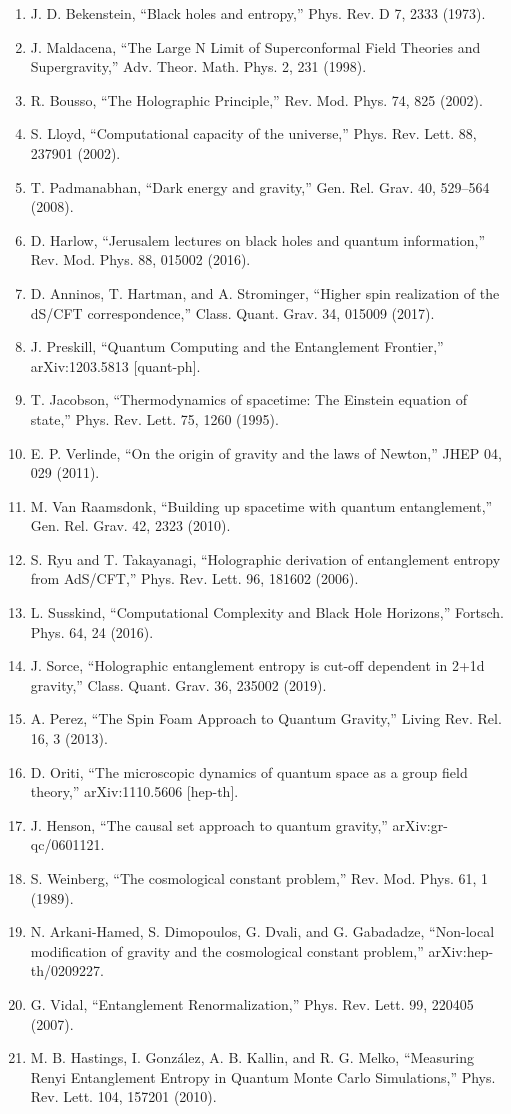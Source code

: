 \documentclass[12pt]{article}
\theoremstyle{plain}
\theoremstyle{definition}
\theoremstyle{remark}
\begin{document}
\begin{enumerate}
\item J. D. Bekenstein, ``Black holes and entropy,'' Phys. Rev. D 7, 2333 (1973).
\item J. Maldacena, ``The Large N Limit of Superconformal Field Theories and Supergravity,'' Adv. Theor. Math. Phys. 2, 231 (1998).
\item R. Bousso, ``The Holographic Principle,'' Rev. Mod. Phys. 74, 825 (2002).
\item S. Lloyd, ``Computational capacity of the universe,'' Phys. Rev. Lett. 88, 237901 (2002).
\item T. Padmanabhan, ``Dark energy and gravity,'' Gen. Rel. Grav. 40, 529–564 (2008).
\item D. Harlow, ``Jerusalem lectures on black holes and quantum information,'' Rev. Mod. Phys. 88, 015002 (2016).
\item D. Anninos, T. Hartman, and A. Strominger, ``Higher spin realization of the dS/CFT correspondence,'' Class. Quant. Grav. 34, 015009 (2017).
\item J. Preskill, ``Quantum Computing and the Entanglement Frontier,'' arXiv:1203.5813 [quant-ph].
\item T. Jacobson, ``Thermodynamics of spacetime: The Einstein equation of state,'' Phys. Rev. Lett. 75, 1260 (1995).
\item E. P. Verlinde, ``On the origin of gravity and the laws of Newton,'' JHEP 04, 029 (2011).
\item M. Van Raamsdonk, ``Building up spacetime with quantum entanglement,'' Gen. Rel. Grav. 42, 2323 (2010).
\item S. Ryu and T. Takayanagi, ``Holographic derivation of entanglement entropy from AdS/CFT,'' Phys. Rev. Lett. 96, 181602 (2006).
\item L. Susskind, ``Computational Complexity and Black Hole Horizons,'' Fortsch. Phys. 64, 24 (2016).
\item J. Sorce, ``Holographic entanglement entropy is cut-off dependent in 2+1d gravity,'' Class. Quant. Grav. 36, 235002 (2019).
\item A. Perez, ``The Spin Foam Approach to Quantum Gravity,'' Living Rev. Rel. 16, 3 (2013).
\item D. Oriti, ``The microscopic dynamics of quantum space as a group field theory,'' arXiv:1110.5606 [hep-th].
\item J. Henson, ``The causal set approach to quantum gravity,'' arXiv:gr-qc/0601121.
\item S. Weinberg, ``The cosmological constant problem,'' Rev. Mod. Phys. 61, 1 (1989).
\item N. Arkani-Hamed, S. Dimopoulos, G. Dvali, and G. Gabadadze, ``Non-local modification of gravity and the cosmological constant problem,'' arXiv:hep-th/0209227.
\item G. Vidal, ``Entanglement Renormalization,'' Phys. Rev. Lett. 99, 220405 (2007).
\item M. B. Hastings, I. González, A. B. Kallin, and R. G. Melko, ``Measuring Renyi Entanglement Entropy in Quantum Monte Carlo Simulations,'' Phys. Rev. Lett. 104, 157201 (2010).
\end{enumerate}
\end{document}
